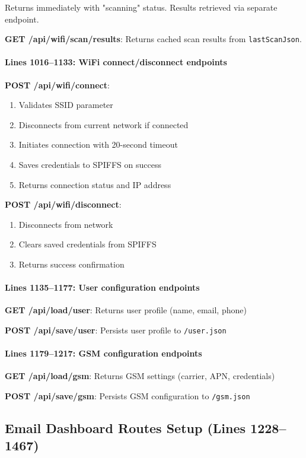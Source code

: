 \documentclass[11pt,a4paper]{article}
\begin{document}
Returns immediately with "scanning" status. Results retrieved via separate endpoint.

\textbf{GET /api/wifi/scan/results}: Returns cached scan results from \texttt{lastScanJson}.

\paragraph{Lines 1016--1133: WiFi connect/disconnect endpoints}
\textbf{POST /api/wifi/connect}:
\begin{enumerate}[leftmargin=*]
  \item Validates SSID parameter
  \item Disconnects from current network if connected
  \item Initiates connection with 20-second timeout
  \item Saves credentials to SPIFFS on success
  \item Returns connection status and IP address
\end{enumerate}

\textbf{POST /api/wifi/disconnect}:
\begin{enumerate}[leftmargin=*]
  \item Disconnects from network
  \item Clears saved credentials from SPIFFS
  \item Returns success confirmation
\end{enumerate}

\paragraph{Lines 1135--1177: User configuration endpoints}
\textbf{GET /api/load/user}: Returns user profile (name, email, phone)

\textbf{POST /api/save/user}: Persists user profile to \texttt{/user.json}

\paragraph{Lines 1179--1217: GSM configuration endpoints}
\textbf{GET /api/load/gsm}: Returns GSM settings (carrier, APN, credentials)

\textbf{POST /api/save/gsm}: Persists GSM configuration to \texttt{/gsm.json}

\subsection{Email Dashboard Routes Setup (Lines 1228--1467)}
\end{document}
